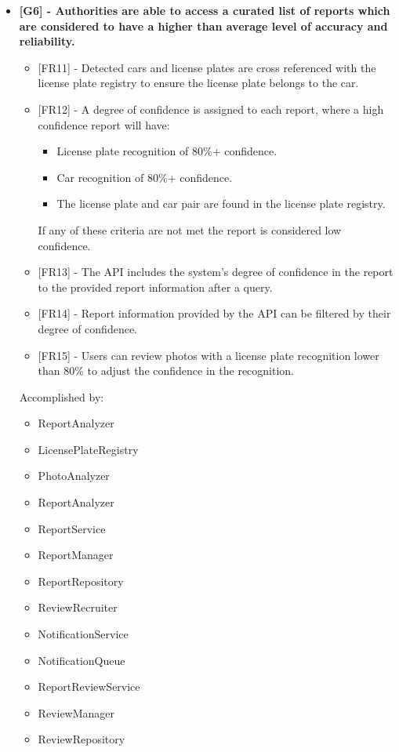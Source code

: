 \begin{itemize}[label={}]
    \item \textbf{[G6] - Authorities are able to access a curated list of reports which are considered to have a higher than average level of accuracy and reliability.}
        \begin{itemize}[label={}]
            \item {[FR11]} - Detected cars and license plates are cross referenced with the license plate registry to ensure the license plate belongs to the car.
            \item {[FR12]} - A degree of confidence is assigned to each report, where a high confidence report will have:
                \begin{itemize}[label={\textbullet}]
                    \item License plate recognition of 80\%+ confidence.
                    \item Car recognition of 80\%+ confidence.
                    \item The license plate and car pair are found in the license plate registry.
                \end{itemize}
            If any of these criteria are not met the report is considered low confidence.
            \item {[FR13]} - The API includes the system’s degree of confidence in the report to the provided report information after a query.
            \item {[FR14]} - Report information provided by the API can be filtered by their degree of confidence.
            \item {[FR15]} - Users can review photos with a license plate recognition lower than 80\% to adjust the confidence in the recognition.
        \end{itemize}
        Accomplished by:
        \begin{itemize}[label={\textbullet}]
            \item ReportAnalyzer
            \item LicensePlateRegistry
            \item PhotoAnalyzer
            \item ReportAnalyzer
            \item ReportService
            \item ReportManager
            \item ReportRepository
            \item ReviewRecruiter
            \item NotificationService
            \item NotificationQueue
            \item ReportReviewService
            \item ReviewManager
            \item ReviewRepository
        \end{itemize}


\end{itemize}
